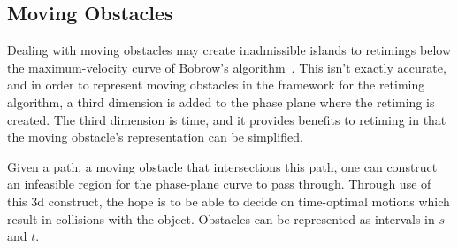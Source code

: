 \documentclass[letterpaper,10pt]{article} %
\begin{document}
\subsection{Moving Obstacles}\label{subsec:movobs}

Dealing with moving obstacles may create inadmissible islands to retimings below the maximum-velocity curve of Bobrow's algorithm~\cite{shin1985minimum}. This isn't exactly accurate, and in order to represent moving obstacles in the framework for the retiming algorithm, a third dimension is added to the phase plane where the retiming is created. The third dimension is time, and it provides benefits to retiming in that the moving obstacle's representation can be simplified.

Given a path, a moving obstacle that intersections this path, one can construct an infeasible region for the phase-plane curve to pass through. Through use of this 3d construct, the hope is to be able to decide on time-optimal motions which result in collisions with the object. Obstacles can be represented as intervals in $s$ and $t$.








\end{document}
